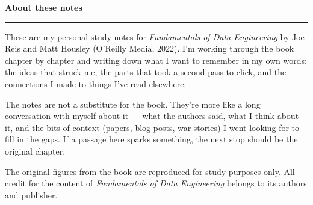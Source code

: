 \documentclass[12pt, a4paper, openany]{book}
\begin{document}
\begin{titlepage}
\end{titlepage}

\thispagestyle{empty}
\vspace*{2cm}
{\color{berkeleyblue}\Large\bfseries About these notes}\\
{\color{californiagold}\rule{6cm}{1pt}}

\vspace{1em}
\noindent These are my personal study notes for \emph{Fundamentals of Data Engineering} by Joe Reis and Matt Housley (O'Reilly Media, 2022). I'm working through the book chapter by chapter and writing down what I want to remember in my own words: the ideas that struck me, the parts that took a second pass to click, and the connections I made to things I've read elsewhere.

\vspace{1em}
\noindent The notes are not a substitute for the book. They're more like a long conversation with myself about it — what the authors said, what I think about it, and the bits of context (papers, blog posts, war stories) I went looking for to fill in the gaps. If a passage here sparks something, the next stop should be the original chapter.

\vspace{1em}
\noindent The original figures from the book are reproduced for study purposes only. All credit for the content of \emph{Fundamentals of Data Engineering} belongs to its authors and publisher.
\end{document}
